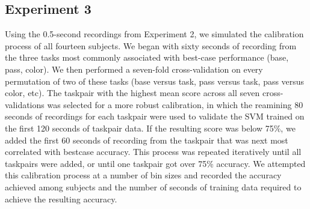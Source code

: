 \subsection{Experiment 3}
Using the 0.5-second recordings from Experiment 2, we simulated the calibration process of all fourteen subjects. We began with sixty seconds of recording from the three tasks most commonly associated with best-case performance (base, pass, color). We then performed a seven-fold cross-validation on every permutation of two of these tasks (base versus task, pass versus task, pass versus color, etc). The taskpair with the highest mean score across all seven cross-validations was selected for a more robust calibration, in which the reamining 80 seconds of recordings for each taskpair were used to validate the SVM trained on the first 120 seconds of taskpair data. If the resulting score was below 75\%, we added the first 60 seconds of recording from the taskpair that was next most correlated with bestcase accuracy. This process was repeated iteratively until all taskpairs were added, or until one taskpair got over 75\% accuracy. We attempted this calibration process at a number of bin sizes and recorded the accuracy achieved among subjects and the number of seconds of training data required to achieve the resulting accuracy.